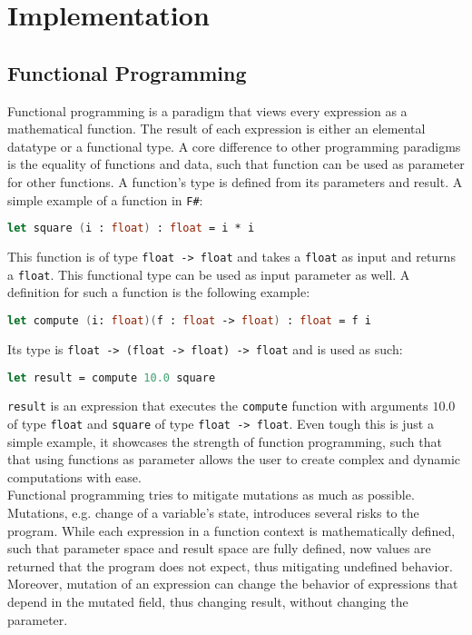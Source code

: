 \chapter{Implementation}


\section{Functional Programming}
\label{sec:funprog}
Functional programming is a paradigm that views every expression as a mathematical function. The result of each expression is either an elemental datatype or a functional type. A core difference to other programming paradigms is the equality of functions and data, such that function can be used as parameter for other functions. A function's type is defined from its parameters and result. A simple example of a function in \verb|F#|: 

\begin{lstlisting}[language=FSharp]
let square (i : float) : float = i * i 
\end{lstlisting}

This function is of type \verb|float -> float| and takes a \verb|float| as input and returns a \verb|float|. This functional type can be used as input parameter as well. A definition for such a function is the following example: 

\begin{lstlisting}[language=FSharp]
let compute (i: float)(f : float -> float) : float = f i
\end{lstlisting}
Its type is \verb|float -> (float -> float) -> float| and is used as such: 
\begin{lstlisting}[language=FSharp]
let result = compute 10.0 square
\end{lstlisting}

\verb|result| is an expression that executes the \verb|compute| function with arguments $10.0$ of type \verb|float| and \verb|square| of type \verb|float -> float|. Even tough this is just a simple example, it showcases the strength of function programming, such that that using functions as parameter allows the user to create complex and dynamic computations with ease. 
\\

Functional programming tries to mitigate mutations as much as possible. Mutations, e.g. change of a variable's state, introduces several risks to the program. While each expression in a function context is mathematically defined, such that parameter space and result space are fully defined, now values are returned that the program does not expect, thus mitigating undefined behavior. Moreover, mutation of an expression can change the behavior of expressions that depend in the mutated field, thus changing result, without changing the parameter. 
\\

